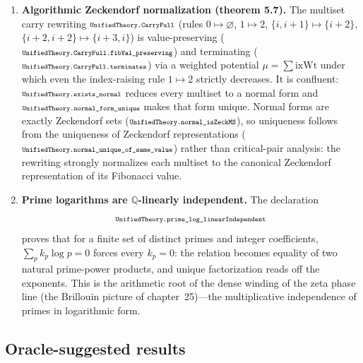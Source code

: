 \documentclass[11pt]{article}
\newcommand{\lean}[1]{\relax\ifmmode\hbox{\scriptsize\ttfamily\detokenize{#1}}\else{\small\texttt{\detokenize{#1}}}\fi}
\begin{document}
\begin{enumerate}[label=(G\arabic*)]
  \item \textbf{Algorithmic Zeckendorf normalization (theorem 5.7).}  The multiset carry rewriting $\lean{UnifiedTheory.CarryFull}$ (rules $0\mapsto\varnothing$, $1\mapsto2$, $\{i,i{+}1\}\mapsto\{i{+}2\}$, $\{i{+}2,i{+}2\}\mapsto\{i{+}3,i\}$) is value-preserving ($\lean{UnifiedTheory.CarryFull.fibVal_preserving}$) and terminating ($\lean{UnifiedTheory.CarryFull.terminates}$) via a weighted potential $\mu=\sum\mathrm{ixWt}$ under which even the index-raising rule $1\mapsto2$ strictly decreases.  It is confluent: $\lean{UnifiedTheory.exists_normal}$ reduces every multiset to a normal form and $\lean{UnifiedTheory.normal_form_unique}$ makes that form unique.  Normal forms are exactly Zeckendorf sets ($\lean{UnifiedTheory.normal_isZeckMS}$), so uniqueness follows from the uniqueness of Zeckendorf representations ($\lean{UnifiedTheory.normal_unique_of_same_value}$) rather than critical-pair analysis: the rewriting strongly normalizes each multiset to the canonical Zeckendorf representation of its Fibonacci value.
  \item \textbf{Prime logarithms are $\mathbb{Q}$-linearly independent.}  The declaration
  $$
    \lean{UnifiedTheory.prime_log_linearIndependent}
  $$
  proves that for a finite set of distinct primes and integer coefficients, $\sum_p k_p\log p=0$ forces every $k_p=0$: the relation becomes equality of two natural prime-power products, and unique factorization reads off the exponents.  This is the arithmetic root of the dense winding of the zeta phase line (the Brillouin picture of chapter~25)---the multiplicative independence of primes in logarithmic form.
\end{enumerate}

\subsection*{Oracle-suggested results}
\end{document}
